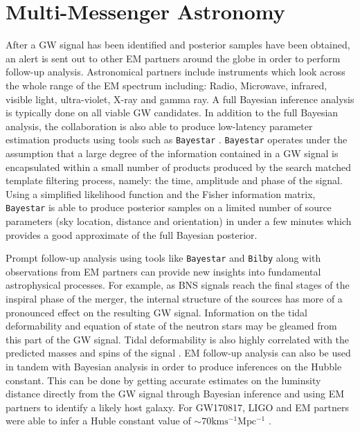 %
%



\section{Multi-Messenger Astronomy}

After a \ac{GW} signal has been identified and posterior samples have 
been obtained, an alert is sent out to other \ac{EM} partners around the 
globe in order to perform follow-up analysis. Astronomical partners include instruments which look across 
the whole range of the \ac{EM} spectrum including: Radio, Microwave, 
infrared, visible light, ultra-violet, X-ray and gamma ray. A full Bayesian 
inference analysis is typically done on all viable \ac{GW} candidates. In 
addition to the full Bayesian analysis, the collaboration is also able 
to produce low-latency parameter estimation products using tools such as \texttt{Bayestar} \cite{2016PhRvD..93b4013S}. \texttt{Bayestar} operates under the 
assumption that a large degree of the information contained in a \ac{GW} 
signal is encapsulated within a small number of products produced by the 
search matched template filtering process, namely: the time, amplitude 
and phase of the signal. Using a simplified likelihood function and the 
Fisher information matrix, \texttt{Bayestar} is able to produce posterior 
samples on a limited number of source parameters (sky location, distance and orientation) 
in under a few minutes which provides a good approximate of the full 
Bayesian posterior.

Prompt follow-up analysis using tools like \texttt{Bayestar} and 
\texttt{Bilby} along with observations from \ac{EM} partners can 
provide new insights into fundamental astrophysical processes. For 
example, as \ac{BNS} signals reach the final stages of the inspiral 
phase of the merger, the internal structure of the sources has more 
of a pronounced effect on the resulting \ac{GW} signal. 
Information on the tidal deformability and equation 
of state of the neutron stars may be gleamed from this part of the 
\ac{GW} signal. Tidal deformability is also highly correlated with the 
predicted masses and spins of the signal \cite{PhysRevLett.119.161101}. 
\ac{EM} follow-up analysis can also be used in tandem with Bayesian 
analysis in order to produce inferences on the Hubble constant. This can 
be done by getting accurate estimates on the luminsity distance directly 
from the \ac{GW} signal through Bayesian inference and using \ac{EM} 
partners to identify a likely host galaxy. For GW170817, \ac{LIGO} 
and \ac{EM} partners were able to infer a Huble constant value 
of $\sim 70 \mathrm{km s^{-1} Mpc^{-1}}$ \cite{PhysRevLett.119.161101}. 
 
